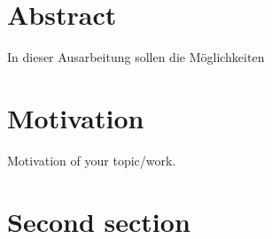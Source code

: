 \documentclass[12pt,english,seminar]{dbvstudentwork}
\begin{document}
  \begin{dbvstudentworkTitlepage}




    \Deadline{\today}


  \end{dbvstudentworkTitlepage}

\section{Abstract} %

  In dieser Ausarbeitung sollen die Möglichkeiten 

\clearpage
\tableofcontents
\clearpage


\section{Motivation}
\label{sec:motivation}

  Motivation of your topic/work.


\section{Second section}
\label{sec:second}
\end{document}
